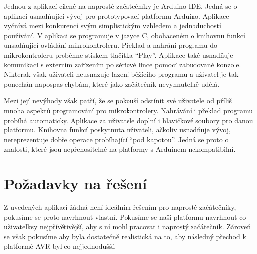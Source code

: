 Jednou z aplikací cílené na naprosté začátečníky je Arduino IDE\todocite. Jedná se o aplikaci usnadňující vývoj pro prototypovací platformu Arduino\todocite. Aplikace vyčnívá mezi konkurencí svým simplistickým vzhledem a jednoduchostí používání. V aplikaci se programuje v jazyce C, obohaceném o knihovnu funkcí unsadňující ovládání mikrokontroleru. Překlad a nahrání programu do mikrokontroleru proběhne stiskem tlačítka ``Play''. Aplikace také usnadňuje komunikaci s externím zařízením po sériové lince pomocí zabudované konzole. Nikterak však uživateli neusnazuje lazení běžícího programu a uživatel je tak ponechán napospas chybám, které jako začátečník nevyhnutelně udělá.

Mezi její nevýhody však patří, že se pokouší odstínit své uživatele od příliš mnoha aspektů programování pro mikrokontrolery. Nahrávání i překlad programu probíhá automaticky. Aplikace za uživatele doplní i hlavičkové soubory pro danou platformu. Knihovna funkcí poskytnuta uživateli, ačkoliv usnadňuje vývoj, nereprezentuje dobře operace probíhající ``pod kapotou''. Jedná se proto o znalosti, které jsou nepřenositelné na platformy s Arduinem nekompatibilní.


\section{Požadavky na řešení}

Z uvedených aplikací žádná není ideálním řešením pro naprosté začátečníky, pokusíme se proto navrhnout vlastní. Pokusíme se naši platformu navrhnout co uživatelksy nejpřívětivější, aby s ní mohl pracovat i naprostý začátečník. Zároveň se však pokusíme aby byla dostatečně realistická na to, aby následný přechod k platformě AVR byl co nejjednodušší.